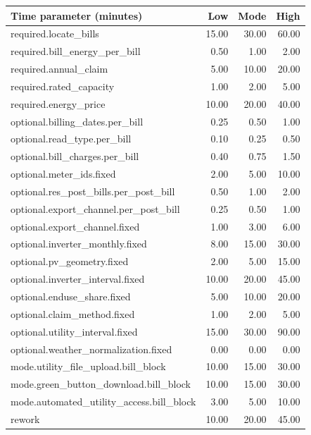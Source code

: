 \begin{tabular}{lrrr}
\hline
Time parameter (minutes) & Low & Mode & High \\
\hline
required.locate\_bills & 15.00 & 30.00 & 60.00 \\
required.bill\_energy\_per\_bill & 0.50 & 1.00 & 2.00 \\
required.annual\_claim & 5.00 & 10.00 & 20.00 \\
required.rated\_capacity & 1.00 & 2.00 & 5.00 \\
required.energy\_price & 10.00 & 20.00 & 40.00 \\
optional.billing\_dates.per\_bill & 0.25 & 0.50 & 1.00 \\
optional.read\_type.per\_bill & 0.10 & 0.25 & 0.50 \\
optional.bill\_charges.per\_bill & 0.40 & 0.75 & 1.50 \\
optional.meter\_ids.fixed & 2.00 & 5.00 & 10.00 \\
optional.res\_post\_bills.per\_post\_bill & 0.50 & 1.00 & 2.00 \\
optional.export\_channel.per\_post\_bill & 0.25 & 0.50 & 1.00 \\
optional.export\_channel.fixed & 1.00 & 3.00 & 6.00 \\
optional.inverter\_monthly.fixed & 8.00 & 15.00 & 30.00 \\
optional.pv\_geometry.fixed & 2.00 & 5.00 & 15.00 \\
optional.inverter\_interval.fixed & 10.00 & 20.00 & 45.00 \\
optional.enduse\_share.fixed & 5.00 & 10.00 & 20.00 \\
optional.claim\_method.fixed & 1.00 & 2.00 & 5.00 \\
optional.utility\_interval.fixed & 15.00 & 30.00 & 90.00 \\
optional.weather\_normalization.fixed & 0.00 & 0.00 & 0.00 \\
mode.utility\_file\_upload.bill\_block & 10.00 & 15.00 & 30.00 \\
mode.green\_button\_download.bill\_block & 10.00 & 15.00 & 30.00 \\
mode.automated\_utility\_access.bill\_block & 3.00 & 5.00 & 10.00 \\
rework & 10.00 & 20.00 & 45.00 \\
\hline
\end{tabular}
